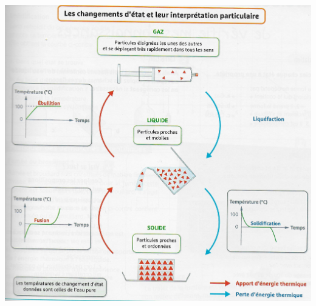 \documentclass[12pt,a4paper]{article}
\begin{document}
	\begin{center}
		\includegraphics[scale=0.7]{chgmt_etats}
	\end{center}
\appendix

\end{document}
